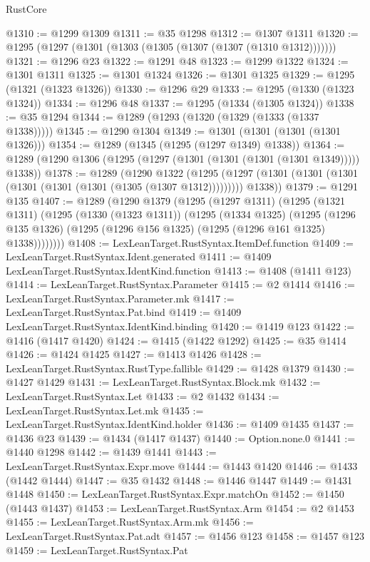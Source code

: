 \begin{lexlean}{RustCore}
\begin{coremodule}
@1310 := @1299 @1309
@1311 := @35 @1298
@1312 := @1307 @1311
@1320 := @1295 (@1297 (@1301 (@1303 (@1305 (@1307 (@1307 (@1310 @1312)))))))
@1321 := @1296 @23
@1322 := @1291 @48
@1323 := @1299 @1322
@1324 := @1301 @1311
@1325 := @1301 @1324
@1326 := @1301 @1325
@1329 := @1295 (@1321 (@1323 @1326))
@1330 := @1296 @29
@1333 := @1295 (@1330 (@1323 @1324))
@1334 := @1296 @48
@1337 := @1295 (@1334 (@1305 @1324))
@1338 := @35 @1294
@1344 := @1289 (@1293 (@1320 (@1329 (@1333 (@1337 @1338)))))
@1345 := @1290 @1304
@1349 := @1301 (@1301 (@1301 (@1301 @1326)))
@1354 := @1289 (@1345 (@1295 (@1297 @1349) @1338))
@1364 := @1289 (@1290 @1306 (@1295 (@1297 (@1301 (@1301 (@1301 (@1301 @1349))))) @1338))
@1378 := @1289
    (@1290
      @1322
      (@1295 (@1297 (@1301 (@1301 (@1301 (@1301 (@1301 (@1301 (@1305 (@1307 @1312))))))))) @1338))
@1379 := @1291 @135
@1407 := @1289
    (@1290
      @1379
      (@1295
        (@1297 @1311)
        (@1295
          (@1321 @1311)
          (@1295
            (@1330 (@1323 @1311))
            (@1295
              (@1334 @1325)
              (@1295
                (@1296 @135 @1326)
                (@1295 (@1296 @156 @1325) (@1295 (@1296 @161 @1325) @1338))))))))
@1408 := LexLeanTarget.RustSyntax.ItemDef.function
@1409 := LexLeanTarget.RustSyntax.Ident.generated
@1411 := @1409 LexLeanTarget.RustSyntax.IdentKind.function
@1413 := @1408 (@1411 @123)
@1414 := LexLeanTarget.RustSyntax.Parameter
@1415 := @2 @1414
@1416 := LexLeanTarget.RustSyntax.Parameter.mk
@1417 := LexLeanTarget.RustSyntax.Pat.bind
@1419 := @1409 LexLeanTarget.RustSyntax.IdentKind.binding
@1420 := @1419 @123
@1422 := @1416 (@1417 @1420)
@1424 := @1415 (@1422 @1292)
@1425 := @35 @1414
@1426 := @1424 @1425
@1427 := @1413 @1426
@1428 := LexLeanTarget.RustSyntax.RustType.fallible
@1429 := @1428 @1379
@1430 := @1427 @1429
@1431 := LexLeanTarget.RustSyntax.Block.mk
@1432 := LexLeanTarget.RustSyntax.Let
@1433 := @2 @1432
@1434 := LexLeanTarget.RustSyntax.Let.mk
@1435 := LexLeanTarget.RustSyntax.IdentKind.holder
@1436 := @1409 @1435
@1437 := @1436 @23
@1439 := @1434 (@1417 @1437)
@1440 := Option.none.{0}
@1441 := @1440 @1298
@1442 := @1439 @1441
@1443 := LexLeanTarget.RustSyntax.Expr.move
@1444 := @1443 @1420
@1446 := @1433 (@1442 @1444)
@1447 := @35 @1432
@1448 := @1446 @1447
@1449 := @1431 @1448
@1450 := LexLeanTarget.RustSyntax.Expr.matchOn
@1452 := @1450 (@1443 @1437)
@1453 := LexLeanTarget.RustSyntax.Arm
@1454 := @2 @1453
@1455 := LexLeanTarget.RustSyntax.Arm.mk
@1456 := LexLeanTarget.RustSyntax.Pat.adt
@1457 := @1456 @123
@1458 := @1457 @123
@1459 := LexLeanTarget.RustSyntax.Pat

\end{coremodule}
\end{lexlean}
